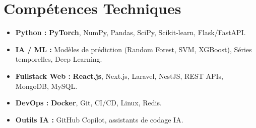 \documentclass[a4paper,11pt]{article}
\begin{document}
\section{Compétences Techniques}
\begin{itemize}[leftmargin=*, nosep]
    \item \small{\textbf{Python :} \textbf{PyTorch}, NumPy, Pandas, SciPy, Scikit-learn, Flask/FastAPI.}
    \item \small{\textbf{IA / ML :} Modèles de prédiction (Random Forest, SVM, XGBoost), Séries temporelles, Deep Learning.}
    \item \small{\textbf{Fullstack Web :} \textbf{React.js}, Next.js, Laravel, NestJS, REST APIs, MongoDB, MySQL.}
    \item \small{\textbf{DevOps :} \textbf{Docker}, Git, CI/CD, Linux, Redis.}
    \item \small{\textbf{Outils IA :} GitHub Copilot, assistants de codage IA.}
\end{itemize}

\end{document}
